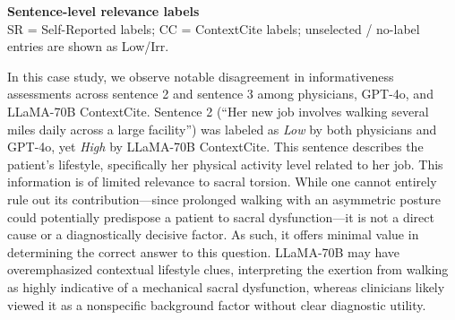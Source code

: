 \documentclass[11pt]{article}
\begin{document}
\begin{tcolorbox}[colback=blue!3!white, colframe=blue!50!white,
                  title=Example of QA Data (from MedXpert QA ID0071), left=10mm, breakable]
\medskip
\centering
\setlength{\tabcolsep}{4pt}
\textbf{Sentence-level relevance labels}\\[2pt]
{\footnotesize SR = Self-Reported labels; CC = ContextCite labels; unselected / no-label entries are shown as Low/Irr.}\\[3pt]
\end{tcolorbox}


In this case study, we observe notable disagreement in informativeness assessments across sentence 2 and sentence 3 among physicians, GPT-4o, and LLaMA-70B ContextCite. Sentence 2 (“Her new job involves walking several miles daily across a large facility”) was labeled as \textit{Low} by both physicians and GPT-4o, yet \textit{High} by LLaMA-70B ContextCite. This sentence describes the patient’s lifestyle, specifically her physical activity level related to her job. This information is of limited relevance to sacral torsion. While one cannot entirely rule out its contribution—since prolonged walking with an asymmetric posture could potentially predispose a patient to sacral dysfunction—it is not a direct cause or a diagnostically decisive factor. As such, it offers minimal value in determining the correct answer to this question. LLaMA-70B may have overemphasized contextual lifestyle clues, interpreting the exertion from walking as highly indicative of a mechanical sacral dysfunction, whereas clinicians likely viewed it as a nonspecific background factor without clear diagnostic utility. 
\end{document}
